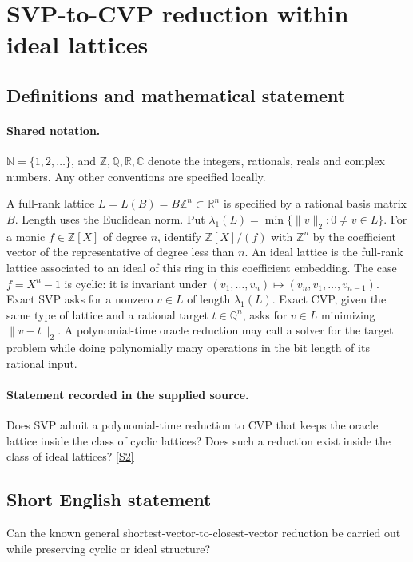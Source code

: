 \documentclass[11pt]{article}
\newcommand{\sref}[2]{\hyperlink{source:#1:#2}{[S#2]}}
\begin{document}
\section{SVP-to-CVP reduction within ideal lattices}\label{statement}

\subsection{Definitions and mathematical statement}

\paragraph{Shared notation.}$\mathbb N=\{1,2,\ldots\}$, and $\mathbb Z,\mathbb Q,\mathbb R,\mathbb C$ denote the integers, rationals, reals and complex numbers. Any other conventions are specified locally.


A full-rank lattice $L=L(B)=B\mathbb Z^n\subset\mathbb R^n$ is specified by a rational basis matrix $B$. Length uses the Euclidean norm. Put $\lambda_1(L)=\min\{\|v\|_2:0\ne v\in L\}$. For a monic $f\in\mathbb Z[X]$ of degree $n$, identify $\mathbb Z[X]/(f)$ with $\mathbb Z^n$ by the coefficient vector of the representative of degree less than $n$. An ideal lattice is the full-rank lattice associated to an ideal of this ring in this coefficient embedding. The case $f=X^n-1$ is cyclic: it is invariant under $(v_1,\ldots,v_n)\mapsto(v_n,v_1,\ldots,v_{n-1})$. Exact SVP asks for a nonzero $v\in L$ of length $\lambda_1(L)$. Exact CVP, given the same type of lattice and a rational target $t\in\mathbb Q^n$, asks for $v\in L$ minimizing $\|v-t\|_2$. A polynomial-time oracle reduction may call a solver for the target problem while doing polynomially many operations in the bit length of its rational input.
\paragraph{Statement recorded in the supplied source.}
Does SVP admit a polynomial-time reduction to CVP that keeps the oracle lattice inside the class of cyclic lattices? Does such a reduction exist inside the class of ideal lattices? \sref{statement}{2}

\subsection{Short English statement}
Can the known general shortest-vector-to-closest-vector reduction be carried out while preserving cyclic or ideal structure?
\end{document}
